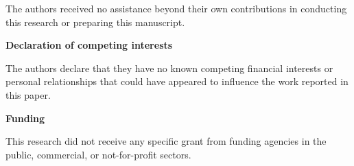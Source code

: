 \documentclass[12pt]{article}
\begin{document}
\medskip

\noindent The authors received no assistance beyond their own contributions in conducting this
research or preparing this manuscript.

\bigskip

\noindent\textbf{Declaration of competing interests}

\medskip

\noindent The authors declare that they have no known competing financial interests or
personal relationships that could have appeared to influence the work reported in this paper.

\bigskip

\noindent\textbf{Funding}

\medskip

\noindent This research did not receive any specific grant from funding agencies in the
public, commercial, or not-for-profit sectors.
\end{document}
